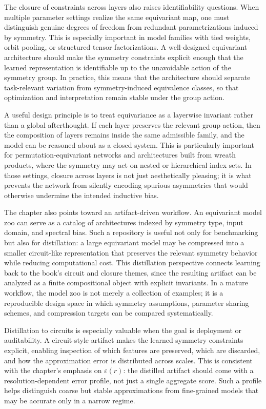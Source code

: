 \documentclass[11pt]{article}
\begin{document}
The closure of constraints across layers also raises identifiability questions. When multiple parameter settings realize the same equivariant map, one must distinguish genuine degrees of freedom from redundant parametrizations induced by symmetry. This is especially important in model families with tied weights, orbit pooling, or structured tensor factorizations. A well-designed equivariant architecture should make the symmetry constraints explicit enough that the learned representation is identifiable up to the unavoidable action of the symmetry group. In practice, this means that the architecture should separate task-relevant variation from symmetry-induced equivalence classes, so that optimization and interpretation remain stable under the group action.

A useful design principle is to treat equivariance as a layerwise invariant rather than a global afterthought. If each layer preserves the relevant group action, then the composition of layers remains inside the same admissible family, and the model can be reasoned about as a closed system. This is particularly important for permutation-equivariant networks and architectures built from wreath products, where the symmetry may act on nested or hierarchical index sets. In those settings, closure across layers is not just aesthetically pleasing; it is what prevents the network from silently encoding spurious asymmetries that would otherwise undermine the intended inductive bias.

The chapter also points toward an artifact-driven workflow. An equivariant model zoo can serve as a catalog of architectures indexed by symmetry type, input domain, and spectral bias. Such a repository is useful not only for benchmarking but also for distillation: a large equivariant model may be compressed into a smaller circuit-like representation that preserves the relevant symmetry behavior while reducing computational cost. This distillation perspective connects learning back to the book's circuit and closure themes, since the resulting artifact can be analyzed as a finite compositional object with explicit invariants. In a mature workflow, the model zoo is not merely a collection of examples; it is a reproducible design space in which symmetry assumptions, parameter sharing schemes, and compression targets can be compared systematically.

Distillation to circuits is especially valuable when the goal is deployment or auditability. A circuit-style artifact makes the learned symmetry constraints explicit, enabling inspection of which features are preserved, which are discarded, and how the approximation error is distributed across scales. This is consistent with the chapter's emphasis on \(\varepsilon(r)\): the distilled artifact should come with a resolution-dependent error profile, not just a single aggregate score. Such a profile helps distinguish coarse but stable approximations from fine-grained models that may be accurate only in a narrow regime.
\end{document}
